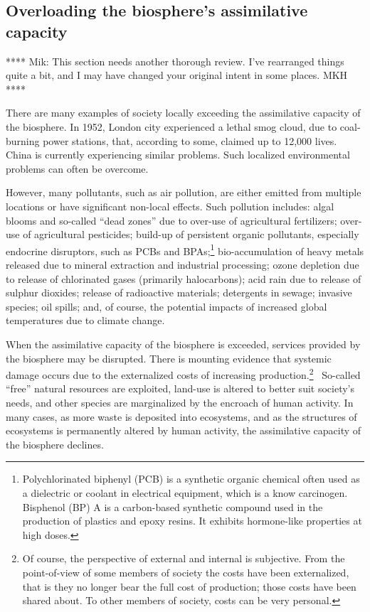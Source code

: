\subsection{Overloading the biosphere's assimilative capacity}

**** Mik: This section needs another thorough review. 
I've rearranged things quite a bit, and I may have 
changed your original intent in some places. MKH ****

There are many examples of society locally exceeding 
the assimilative capacity of the biosphere.
In 1952, London city experienced a lethal smog cloud,
due to coal-burning power stations,
that, according to some, claimed up to 12,000 lives.\cite{Davis2002,Bell2004}
China is currently experiencing similar problems.
Such localized environmental problems can often be overcome. 

However, many pollutants, such as air pollution, are either emitted from multiple locations or have 
significant non-local effects. 
Such pollution includes:
algal blooms and so-called ``dead zones'' due to over-use of agricultural fertilizers;
over-use of agricultural pesticides;
build-up of persistent organic pollutants, especially endocrine disruptors, such as PCBs 
and BPAs;\footnote{Polychlorinated biphenyl (PCB) is a synthetic organic chemical often used as 
	a dielectric or coolant in electrical equipment, which is a know carcinogen.
	Bisphenol (BP) A is a carbon-based synthetic compound used in the production
	of plastics and epoxy resins. It exhibits hormone-like properties at high doses.}
bio-accumulation of heavy metals released due to mineral extraction and industrial processing;
ozone depletion due to release of chlorinated gases (primarily halocarbons);
acid rain due to release of sulphur dioxides;
release of radioactive materials;
detergents in sewage;
invasive species;
oil spills;
and, of course, the potential impacts of increased global temperatures 
due to climate change.\cite{Butler1978, UNMEA2005, Walker2012}

When the assimilative capacity of the biosphere is exceeded, 
services provided by the biosphere may be disrupted. 
There is mounting evidence that systemic
damage occurs due to the externalized costs
of increasing production.\footnote{Of course,
	the perspective of external and internal is subjective.
	From the point-of-view of some members of society
	the costs have been externalized, 
	that is they no longer bear the full cost of production;
	those costs have been shared about.
	To other members of society, costs can be very personal.}~\cite{MEA2005,Ewing2008}
So-called ``free'' natural resources are exploited,
land-use is altered to better suit society's needs,
and other species are marginalized by the encroach of human activity.\cite{Schnaiberg1980}
In many cases, as more waste is deposited into ecosystems,
and as the structures of ecosystems is permanently altered by human activity,
the assimilative capacity of the biosphere declines.\cite{UNMEA2005}


